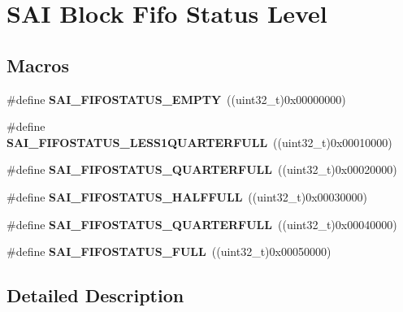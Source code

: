 \hypertarget{group___s_a_i___block___fifo___status___level}{}\section{S\+AI Block Fifo Status Level}
\label{group___s_a_i___block___fifo___status___level}
\subsection*{Macros}
\begin{DoxyCompactItemize}
\item 
\#define {\bfseries S\+A\+I\+\_\+\+F\+I\+F\+O\+S\+T\+A\+T\+U\+S\+\_\+\+E\+M\+P\+TY}~((uint32\+\_\+t)0x00000000)\hypertarget{group___s_a_i___block___fifo___status___level_gae9762268bb555c44d6760e9b691d4cd3}{}\label{group___s_a_i___block___fifo___status___level_gae9762268bb555c44d6760e9b691d4cd3}

\item 
\#define {\bfseries S\+A\+I\+\_\+\+F\+I\+F\+O\+S\+T\+A\+T\+U\+S\+\_\+\+L\+E\+S\+S1\+Q\+U\+A\+R\+T\+E\+R\+F\+U\+LL}~((uint32\+\_\+t)0x00010000)\hypertarget{group___s_a_i___block___fifo___status___level_gaf80468f4df1a17102120c25d83463b11}{}\label{group___s_a_i___block___fifo___status___level_gaf80468f4df1a17102120c25d83463b11}

\item 
\#define {\bfseries S\+A\+I\+\_\+\+F\+I\+F\+O\+S\+T\+A\+T\+U\+S\+\_\+Q\+U\+A\+R\+T\+E\+R\+F\+U\+LL}~((uint32\+\_\+t)0x00020000)\hypertarget{group___s_a_i___block___fifo___status___level_ga3c1140ae55142718b808d1dc8c3724f3}{}\label{group___s_a_i___block___fifo___status___level_ga3c1140ae55142718b808d1dc8c3724f3}

\item 
\#define {\bfseries S\+A\+I\+\_\+\+F\+I\+F\+O\+S\+T\+A\+T\+U\+S\+\_\+\+H\+A\+L\+F\+F\+U\+LL}~((uint32\+\_\+t)0x00030000)\hypertarget{group___s_a_i___block___fifo___status___level_gaffe048527cb52ab64570c3a16e8e08ff}{}\label{group___s_a_i___block___fifo___status___level_gaffe048527cb52ab64570c3a16e8e08ff}

\item 
\#define {\bfseries S\+A\+I\+\_\+\+F\+I\+F\+O\+S\+T\+A\+T\+U\+S\+\_\+Q\+U\+A\+R\+T\+E\+R\+F\+U\+LL}~((uint32\+\_\+t)0x00040000)\hypertarget{group___s_a_i___block___fifo___status___level_ga813ac10d3490c73aa12436838cbdba58}{}\label{group___s_a_i___block___fifo___status___level_ga813ac10d3490c73aa12436838cbdba58}

\item 
\#define {\bfseries S\+A\+I\+\_\+\+F\+I\+F\+O\+S\+T\+A\+T\+U\+S\+\_\+\+F\+U\+LL}~((uint32\+\_\+t)0x00050000)\hypertarget{group___s_a_i___block___fifo___status___level_ga88186f540c8907990f42ab0951f46b3b}{}\label{group___s_a_i___block___fifo___status___level_ga88186f540c8907990f42ab0951f46b3b}

\end{DoxyCompactItemize}


\subsection{Detailed Description}
